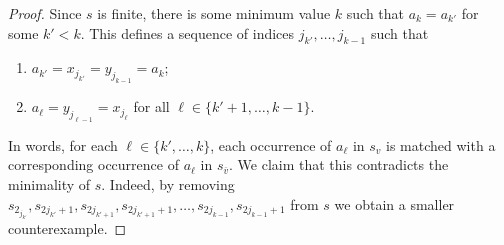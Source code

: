 \documentclass{patmorin}
\begin{document}
\begin{proof}
  Since $s$ is finite, there is some minimum value $k$ such that
  $a_{k}=a_{k'}$ for some $k' < k$.  This defines a sequence of indices
  $j_{k'},\ldots,j_{k-1}$ such that
  \begin{enumerate}
     \item $a_{k'}=x_{j_{k'}}=y_{j_{k-1}}=a_{k}$; 
     \item $a_{\ell}=y_{j_{\ell-1}}=x_{j_\ell}$ for all $\ell\in\{k'+1,\ldots,k-1\}$.
  \end{enumerate}
  In words, for each $\ell\in\{k',\ldots,k\}$, each occurrence of $a_\ell$ in $s_v$ is matched with a corresponding
  occurrence of $a_\ell$ in $s_{\overline{v}}$.
  We claim that this contradicts
  the minimality of $s$. Indeed, by removing
  $s_{2_{j_{k'}}},s_{2j_{k'}+1},s_{2j_{k'+1}},s_{2j_{k'+1}+1},\ldots,s_{2j_{k-1}},s_{2j_{k-1}+1}$
  from $s$ we obtain a smaller counterexample.
\end{proof}
\end{document}
